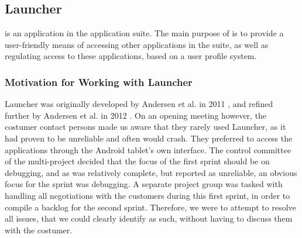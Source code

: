 \subsection{Launcher}
\launcher is an application in the \giraf application suite.
The main purpose of \launcher is to provide a user-friendly means of accessing other applications in the \giraf suite, as well as regulating access to these applications, based on a user profile system.

\subsubsection{Motivation for Working with Launcher}
Launcher was originally developed by Andersen et al. in 2011 \cite{launcher2011}, and refined further by Andersen et al. in 2012 \cite{launcher2012}.
On an opening meeting however, the costumer contact persons made us aware that they rarely used Launcher, as it had proven to be unreliable and often would crash. 
They preferred to access the \giraf applications through the Android tablet's own interface.
The control committee of the multi-project decided that the focus of the first sprint should be on debugging, and as \launcher was relatively complete, but reported as unreliable, an obvious focus for the sprint was debugging. 
A separate project group was tasked with handling all negotiations with the customers during this first sprint, in order to compile a backlog for the second sprint.
Therefore, we were to attempt to resolve all issues, that we could clearly identify as such, without having to discuss them with the costumer.

